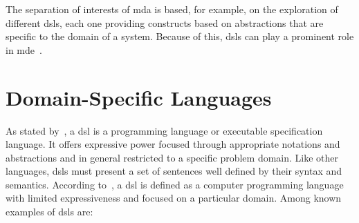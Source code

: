 The separation of interests of \ac{mda} is based, for example, on the exploration of different \acp{dsl}, each one providing constructs based on abstractions that are specific to the domain of a system.
Because of this, \acp{dsl} can play a prominent role in \ac{mde}~\cite{Schmidt:2006, Fowler:2010}.



\section{Domain-Specific Languages}
\label{sec_back:dsl}

As stated by~\cite{vanDeursen:2000}, a \ac{dsl} is a programming language or executable specification language. It offers expressive power focused through appropriate notations and abstractions and in general restricted to a specific problem domain.
Like other languages, \acp{dsl} must present a set of sentences well defined by their syntax and semantics.
According to~\cite{Fowler:2010}, a \ac{dsl} is defined as a computer programming language with limited expressiveness and focused on a particular domain.
Among known examples of \acp{dsl} are:

